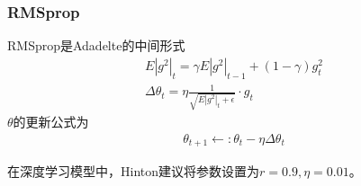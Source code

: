         \subsubsection{RMSprop}
            \par
            RMSprop是Adadelte的中间形式
            \begin{align*}
            E|g^2|_t = \gamma E|g^2|_{t-1}+ (1-\gamma)g_t^2\\
            \Delta \theta_t =\eta \frac{1}{\sqrt{E|g^2|_t + \epsilon}}\cdot g_t
            \end{align*}
            $\theta$的更新公式为
            \begin{align*}
            \theta_{t+1} \leftarrow :\theta_t - \eta \Delta \theta_t
            \end{align*}
            \par
            在深度学习模型中，Hinton建议将参数设置为$r = 0.9,\eta = 0.01$。

